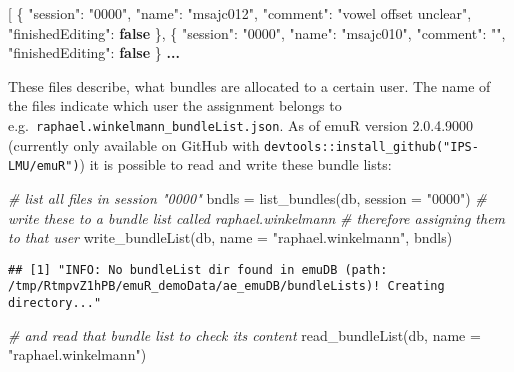 \documentclass[
]{book}
\newenvironment{Shaded}{\begin{snugshade}}{\end{snugshade}}
\newcommand{\AttributeTok}[1]{\textcolor[rgb]{0.77,0.63,0.00}{#1}}
\newcommand{\CommentTok}[1]{\textcolor[rgb]{0.56,0.35,0.01}{\textit{#1}}}
\newcommand{\DataTypeTok}[1]{\textcolor[rgb]{0.13,0.29,0.53}{#1}}
\newcommand{\ErrorTok}[1]{\textcolor[rgb]{0.64,0.00,0.00}{\textbf{#1}}}
\newcommand{\FunctionTok}[1]{\textcolor[rgb]{0.00,0.00,0.00}{#1}}
\newcommand{\KeywordTok}[1]{\textcolor[rgb]{0.13,0.29,0.53}{\textbf{#1}}}
\newcommand{\NormalTok}[1]{#1}
\newcommand{\OtherTok}[1]{\textcolor[rgb]{0.56,0.35,0.01}{#1}}
\newcommand{\StringTok}[1]{\textcolor[rgb]{0.31,0.60,0.02}{#1}}
\begin{document}
\begin{Shaded}
\begin{Highlighting}[]
\OtherTok{[}
    \FunctionTok{\{}
        \DataTypeTok{"session"}\FunctionTok{:} \StringTok{"0000"}\FunctionTok{,}
        \DataTypeTok{"name"}\FunctionTok{:} \StringTok{"msajc012"}\FunctionTok{,}
        \DataTypeTok{"comment"}\FunctionTok{:} \StringTok{"vowel offset unclear"}\FunctionTok{,}
        \DataTypeTok{"finishedEditing"}\FunctionTok{:} \KeywordTok{false}
    \FunctionTok{\}}\OtherTok{,}
    \FunctionTok{\{}
        \DataTypeTok{"session"}\FunctionTok{:} \StringTok{"0000"}\FunctionTok{,}
        \DataTypeTok{"name"}\FunctionTok{:} \StringTok{"msajc010"}\FunctionTok{,}
        \DataTypeTok{"comment"}\FunctionTok{:} \StringTok{""}\FunctionTok{,}
        \DataTypeTok{"finishedEditing"}\FunctionTok{:} \KeywordTok{false}
    \FunctionTok{\}}
\ErrorTok{...}
\end{Highlighting}
\end{Shaded}

These files describe, what bundles are allocated to a certain user. The name of the files indicate which user the assignment belongs to e.g.~\texttt{raphael.winkelmann\_bundleList.json}. As of emuR version 2.0.4.9000 (currently only available on GitHub with \texttt{devtools::install\_github("IPS-LMU/emuR")}) it is possible to read and write these bundle lists:

\begin{Shaded}
\begin{Highlighting}[]
\CommentTok{\# list all files in session "0000"}
\NormalTok{bndls }\OtherTok{=} \FunctionTok{list\_bundles}\NormalTok{(db, }
                     \AttributeTok{session =} \StringTok{"0000"}\NormalTok{)}
\CommentTok{\# write these to a bundle list called raphael.winkelmann}
\CommentTok{\# therefore assigning them to that user }
\FunctionTok{write\_bundleList}\NormalTok{(db, }
                 \AttributeTok{name =} \StringTok{"raphael.winkelmann"}\NormalTok{, }
\NormalTok{                 bndls)}
\end{Highlighting}
\end{Shaded}

\begin{verbatim}
## [1] "INFO: No bundleList dir found in emuDB (path: /tmp/RtmpvZ1hPB/emuR_demoData/ae_emuDB/bundleLists)! Creating directory..."
\end{verbatim}

\begin{Shaded}
\begin{Highlighting}[]
\CommentTok{\# and read that bundle list to check its content}
\FunctionTok{read\_bundleList}\NormalTok{(db, }
                \AttributeTok{name =} \StringTok{"raphael.winkelmann"}\NormalTok{)}
\end{Highlighting}
\end{Shaded}
\end{document}
